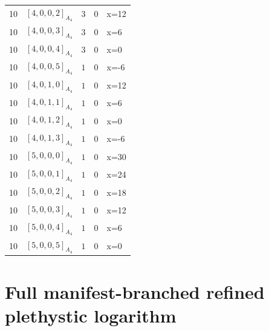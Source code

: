 \documentclass[11pt]{article}
\newcommand{\Dynkin}[1]{#1}
\begin{document}
\begin{longtable}{r l r r l}
10 & $\Dynkin{[4,0,0,2]_{A_4}}$ & $3$ & $0$ & x=12\\
10 & $\Dynkin{[4,0,0,3]_{A_4}}$ & $3$ & $0$ & x=6\\
10 & $\Dynkin{[4,0,0,4]_{A_4}}$ & $3$ & $0$ & x=0\\
10 & $\Dynkin{[4,0,0,5]_{A_4}}$ & $1$ & $0$ & x=-6\\
10 & $\Dynkin{[4,0,1,0]_{A_4}}$ & $1$ & $0$ & x=12\\
10 & $\Dynkin{[4,0,1,1]_{A_4}}$ & $1$ & $0$ & x=6\\
10 & $\Dynkin{[4,0,1,2]_{A_4}}$ & $1$ & $0$ & x=0\\
10 & $\Dynkin{[4,0,1,3]_{A_4}}$ & $1$ & $0$ & x=-6\\
10 & $\Dynkin{[5,0,0,0]_{A_4}}$ & $1$ & $0$ & x=30\\
10 & $\Dynkin{[5,0,0,1]_{A_4}}$ & $1$ & $0$ & x=24\\
10 & $\Dynkin{[5,0,0,2]_{A_4}}$ & $1$ & $0$ & x=18\\
10 & $\Dynkin{[5,0,0,3]_{A_4}}$ & $1$ & $0$ & x=12\\
10 & $\Dynkin{[5,0,0,4]_{A_4}}$ & $1$ & $0$ & x=6\\
10 & $\Dynkin{[5,0,0,5]_{A_4}}$ & $1$ & $0$ & x=0\\
\bottomrule\end{longtable}
\section{Full manifest-branched refined plethystic logarithm}
\end{document}
